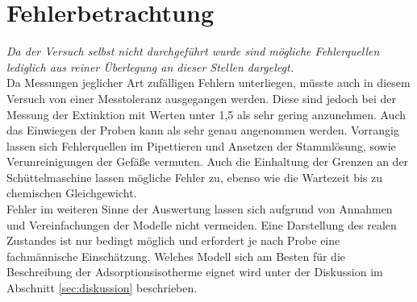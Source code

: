 \vspace*{-10mm}
\section{Fehlerbetrachtung}
\label{sec:fehler}
\textit{Da der Versuch selbst nicht durchgeführt wurde sind mögliche Fehlerquellen lediglich aus reiner Überlegung an dieser Stellen dargelegt.} \\

Da Messungen jeglicher Art zufälligen Fehlern unterliegen, müsste auch in diesem Versuch von einer Messtoleranz ausgegangen werden. Diese sind jedoch bei der Messung der Extinktion mit Werten unter 1,5 als sehr gering anzunehmen. Auch das Einwiegen der Proben kann als sehr genau angenommen werden. Vorrangig lassen sich Fehlerquellen im Pipettieren und Ansetzen der Stammlösung, sowie Verunreinigungen der Gefäße vermuten. Auch die Einhaltung der Grenzen an der Schüttelmaschine lassen mögliche Fehler zu, ebenso wie die Wartezeit bis zu chemischen Gleichgewicht. \\
Fehler im weiteren Sinne der Auswertung lassen sich aufgrund von Annahmen und Vereinfachungen der Modelle nicht vermeiden. Eine Darstellung des realen Zustandes ist nur bedingt möglich und erfordert je nach Probe eine fachmännische Einschätzung. Welches Modell sich am Besten für die Beschreibung der Adsorptionsisotherme eignet wird unter der Diskussion im Abschnitt \ref{sec:diskussion} beschrieben.